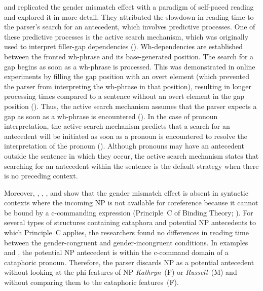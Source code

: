 \documentclass[output=paper,colorlinks,citecolor=brown]{langscibook}
\begin{document}
\citet{kazanina2005} and \citet{kazaninaLauPhillips2007} replicated the gender mismatch effect with a paradigm of self-paced reading and explored it in more detail. They attributed the slowdown in reading time to the parser’s search for an antecedent, which involves predictive processes. One of these predictive processes is the active search mechanism, which was originally used to interpret filler-gap dependencies (\citealt{crain1985, stowe1986, frazier1989, frazierFlores1989, garnsey1989, kaanHolcomb2000, stepanovStateva2015}). Wh-dependencies are established between the fronted wh-phrase and its base-generated position. The search for a gap begins as soon as a wh-phrase is processed. This was demonstrated in online experiments by filling the gap position with an overt element (which prevented the parser from interpreting the wh-phrase in that position), resulting in longer processing times compared to a sentence without an overt element in the gap position (\citealt{crain1985, stowe1986, lee2004}). Thus, the active search mechanism assumes that the parser expects a gap as soon as a wh-phrase is encountered (\citealt{frazier1989}). In the case of pronoun interpretation, the active search mechanism predicts that a search for an antecedent will be initiated as soon as a pronoun is encountered to resolve the interpretation of the pronoun (\citealt{frazier1989, kazaninaLauPhillips2007, kazaninaPhillips2010}). Although pronouns may have an antecedent outside the sentence in which they occur, the active search mechanism states that searching for an antecedent within the sentence is the default strategy when there is no preceding context.

Moreover, \citet{kazaninaLauPhillips2007}, \citet{aoshima2009}, \citet{kazaninaPhillips2010}, and \citet{yoshidaSturt2014} show that the gender mismatch effect is absent in syntactic contexts where the incoming NP is not available for coreference because it cannot be bound by a c-commanding expression (Principle~C of Binding Theory; \citealt{chomsky1981, reinhart1983}). For several types of structures containing cataphora and potential NP antecedents to which Principle~C applies, the researchers found no differences in reading time between the gender-congruent and gender-incongruent conditions. In examples  and , the potential NP antecedent is within the c-command domain of a cataphoric pronoun. Therefore, the parser discards NP as a potential antecedent without looking at the phi-features of NP \textit{Kathryn}~(\textsc{F}) or \textit{Russell}~(\textsc{M}) and without comparing them to the cataphoric features~(F).
\end{document}
